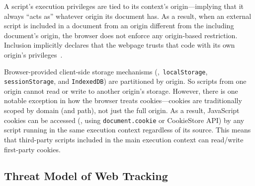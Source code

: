 %
A script's execution privileges are tied to its context’s origin---implying that it always ``acts as'' whatever origin its document has.
%
As a result, when an external script is included in a document from an origin different from the including document's origin, the browser does not enforce any origin-based restriction. 
%
%
Inclusion implicitly declares that the webpage trusts that code with its own origin’s privileges~\cite{TrackingPreventionWebKit2020}. 


%
Browser-provided client-side storage mechanisms (\eg{},~\texttt{localStorage}, \texttt{sessionStorage}, and \texttt{IndexedDB}) are partitioned by origin.
%
So scripts from one origin cannot read or write to another origin’s storage. 
%
However, there is one notable exception in how the browser treats cookies---cookies are traditionally scoped by domain (and path), not just the full origin.
%
As a result, JavaScript cookies can be accessed (\eg{}, using \texttt{document.cookie} or CookieStore API) by any script running in the same execution context regardless of its source. 
%
This means that third-party scripts included in the main execution context can read/write first-party cookies. 


\subsection{Threat Model of Web Tracking}
\label{sec:threat-model}

